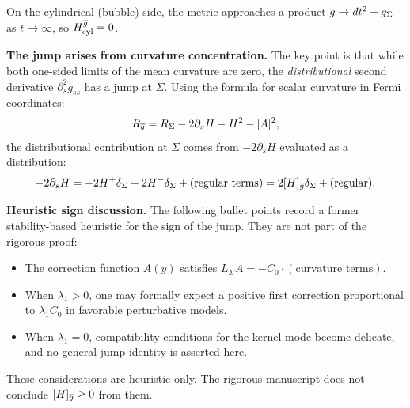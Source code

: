 \begin{remark}
On the cylindrical (bubble) side, the metric approaches a product $\overline{g} \to dt^2 + g_\Sigma$ as $t \to \infty$, so $H^{\overline{g}}_{\text{cyl}} = 0$.

\textbf{The jump arises from curvature concentration.} The key point is that while both one-sided limits of the mean curvature are zero, the \emph{distributional} second derivative $\partial_s^2 g_{ss}$ has a jump at $\Sigma$. Using the formula for scalar curvature in Fermi coordinates:
\[
    R_{\overline{g}} = R_\Sigma - 2\partial_s H - H^2 - |A|^2,
\]
the distributional contribution at $\Sigma$ comes from $-2\partial_s H$ evaluated as a distribution:
\[
    -2\partial_s H = -2 H^+ \delta_\Sigma + 2 H^- \delta_\Sigma + \text{(regular terms)} = 2[H]_{\overline{g}} \delta_\Sigma + \text{(regular)}.
\]

\textbf{Heuristic sign discussion.} The following bullet points record a former stability-based heuristic for the sign of the jump. They are not part of the rigorous proof:
\begin{itemize}
    \item The correction function $A(y)$ satisfies $L_\Sigma A = -C_0 \cdot (\text{curvature terms})$.
    \item When $\lambda_1 > 0$, one may formally expect a positive first correction proportional to $\lambda_1 C_0$ in favorable perturbative models.
    \item When $\lambda_1 = 0$, compatibility conditions for the kernel mode become delicate, and no general jump identity is asserted here.
\end{itemize}

These considerations are heuristic only. The rigorous manuscript does not conclude $[H]_{\overline{g}} \ge 0$ from them.
\end{remark}

